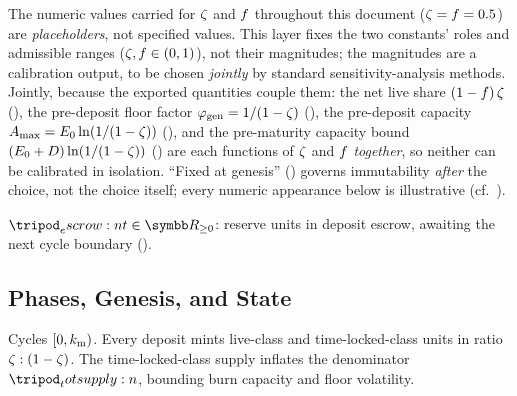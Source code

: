 \documentclass[../main.tex]{subfiles}
\begin{document}
\begin{remark}
    \label{rem:model:calibration}
    The numeric values carried for $\zeta$ and $f$ throughout this
    document ($\zeta = f = 0.5$) are \emph{placeholders}, not specified
    values. This layer fixes the two constants' roles and admissible ranges
    ($\zeta, f \in (0,1)$), not their magnitudes; the magnitudes are a
    calibration output, to be chosen \emph{jointly} by standard sensitivity-analysis
    methods. Jointly, because the exported quantities couple them: the net live share
    $ (1-f)\,\zeta $ (), the pre-deposit floor factor
    $\varphi\sb{\mathrm{gen}} = 1/(1-\zeta)$
    (), the pre-deposit capacity
    $A\sb{\max} = E\sb{0}\ln(1/(1-\zeta))$
    (), and the pre-maturity capacity bound
    $(E\sb{0} + D)\ln(1/(1-\zeta))$
    () are each functions of
    $\zeta$ and $f$ \emph{together}, so neither can be calibrated in
    isolation. ``Fixed at genesis'' ()
    governs immutability \emph{after} the choice, not the choice itself; every numeric
    appearance below is illustrative (cf.\ ).
\end{remark}

\begin{definition}
    \label{def:model:escrow}
    $\escrow{t} \in \R_{\geq 0}$: reserve units in deposit escrow, awaiting the next cycle
    boundary ().
\end{definition}

\subsection{Phases, Genesis, and State}
\label{sec:model:genesis}

\begin{definition}
    \label{def:model:bootstrapping-phase}
    Cycles $[0, k\sb{\mathrm{m}})$. Every deposit mints live-class and time-locked-class units in
    ratio $\zeta : (1-\zeta)$. The time-locked-class supply inflates the
    denominator $\totsupply{}$, bounding burn capacity and floor volatility.
\end{definition}
\end{document}
